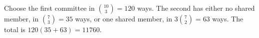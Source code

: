 Choose the first committee in $\binom{10}3=120$ ways. The second has either no shared member, in $\binom73=35$ ways, or one shared member, in $3\binom72=63$ ways. The total is $120(35+63)=\boxed{11760}$.
